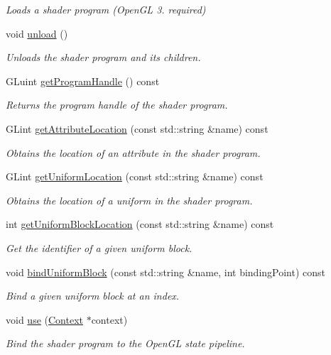 \begin{DoxyCompactItemize}
\begin{DoxyCompactList}\small\item\em Loads a shader program (Open\+GL 3. required) \end{DoxyCompactList}\item 
void \hyperlink{class_shader_program_a45ba12614fbdc743632baa677edd2247}{unload} ()
\begin{DoxyCompactList}\small\item\em Unloads the shader program and its children. \end{DoxyCompactList}\item 
G\+Luint \hyperlink{class_shader_program_a90f0b84a857b82aa1220246e9aeed9bd}{get\+Program\+Handle} () const 
\begin{DoxyCompactList}\small\item\em Returns the program handle of the shader program. \end{DoxyCompactList}\item 
G\+Lint \hyperlink{class_shader_program_aba49891be3e62c2fa03f3e0f03abd7df}{get\+Attribute\+Location} (const std\+::string \&name) const 
\begin{DoxyCompactList}\small\item\em Obtains the location of an attribute in the shader program. \end{DoxyCompactList}\item 
G\+Lint \hyperlink{class_shader_program_a434f4f504303d9132c5b8b89126d8c08}{get\+Uniform\+Location} (const std\+::string \&name) const 
\begin{DoxyCompactList}\small\item\em Obtains the location of a uniform in the shader program. \end{DoxyCompactList}\item 
int \hyperlink{class_shader_program_a771afbb9e66163c6ac685eb16d690ba0}{get\+Uniform\+Block\+Location} (const std\+::string \&name) const 
\begin{DoxyCompactList}\small\item\em Get the identifier of a given uniform block. \end{DoxyCompactList}\item 
void \hyperlink{class_shader_program_a753715c1bcc5c718f15c29ccb09a7261}{bind\+Uniform\+Block} (const std\+::string \&name, int binding\+Point) const 
\begin{DoxyCompactList}\small\item\em Bind a given uniform block at an index. \end{DoxyCompactList}\item 
void \hyperlink{class_shader_program_ad9fef410acc1d6246ea32fa4e5b48b8a}{use} (\hyperlink{class_context}{Context} $\ast$context)
\begin{DoxyCompactList}\small\item\em Bind the shader program to the Open\+GL state pipeline. \end{DoxyCompactList}\end{DoxyCompactItemize}
